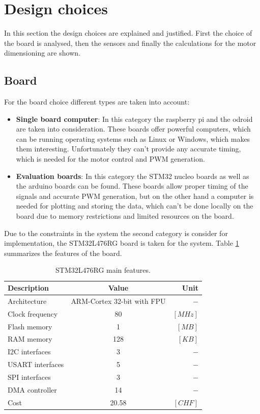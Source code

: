 \documentclass[12pt,a4paper]{article}
\begin{document}
\section{Design choices}\label{sec:design}
In this section the design choices are explained and justified. First the choice of the board is analysed, then the sensors and finally the calculations for the motor dimensioning are shown.
\subsection{Board}
For the board choice different types are taken into account:
\begin{itemize}
	\item \textbf{Single board computer}: In this category the raspberry pi and the odroid are taken into consideration. These boards offer powerful computers, which can be running operating systems such as Linux or Windows, which makes them interesting. Unfortunately they can't provide any accurate timing,  which is needed for the motor control and PWM generation.
	\item \textbf{Evaluation boards}: In this category the STM32 nucleo boards as well as the arduino boards can be found. These boards allow proper timing of the signals and accurate PWM generation, but on the other hand a computer is needed for plotting and storing the data, which can't be done locally on the board due to memory restrictions and limited resources on the board.
\end{itemize}
Due to the constraints in the system the second category is consider for implementation, the STM32L476RG board is taken for the system. Table \ref{tab:board} summarizes the features of the board.
\begin{table}[H]
	\centering
	\begin{tabular}{l||c|r} 
		\textbf{Description}&\textbf{Value}  &\textbf{Unit}  \\ 
		\hline
		\hline 
		Architecture & ARM-Cortex 32-bit with FPU & $-$ \\ 
		\hline 
		Clock frequency & 80  & $[MHz]$  \\ 
		\hline 
		Flash memory & 1 & $[MB]$ \\ 
		\hline 
		RAM memory & 128 & $[KB]$  \\ 
		\hline 
		I2C interfaces & 3 & $-$  \\ 
		\hline 
		USART interfaces & 5  & $-$  \\ 
		\hline 
		SPI interfaces & 3  & $-$  \\  
		\hline 
		DMA controller & 14 & $-$  \\
		\hline
		Cost & 20.58 &$[CHF]$
	\end{tabular} 
	\caption{STM32L476RG main features.}
	\label{tab:board}
\end{table}
\end{document}
